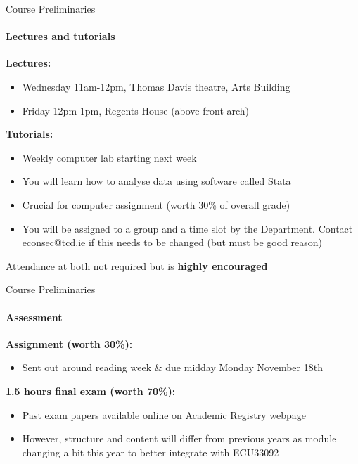 \documentclass[11pt,english,handout]{beamer}
\begin{document}
\begin{frame}{Course Preliminaries}
\framesubtitle{Lectures and tutorials}

\textbf{Lectures:}
\begin{itemize}
	\item Wednesday 11am-12pm, Thomas Davis theatre, Arts Building
	\item Friday 12pm-1pm, Regents House (above front arch)
\end{itemize}
\vspace{0.5cm}

\textbf{Tutorials:}
\begin{itemize}
	\item Weekly computer lab starting next week 
	\item You will learn how to analyse data using software called Stata
	\item Crucial for computer assignment (worth 30\% of overall grade)
	\item You will be assigned to a group and a time slot by the Department. Contact econsec@tcd.ie if this needs to be changed (but must be good reason)
\end{itemize}
\vspace{0.5cm}

Attendance at both not required but is \textbf{highly encouraged}

\end{frame}

\begin{frame}{Course Preliminaries}
	\framesubtitle{Assessment}

\textbf{Assignment (worth 30\%):}
\begin{itemize}
	\item Sent out around reading week \& due midday Monday November 18th
\end{itemize}
\vspace{1cm}

\textbf{1.5 hours final exam (worth 70\%):}
	\begin{itemize}
		\item Past exam papers available online on Academic Registry webpage
		\item However, structure and content will differ from previous years as module changing a bit this year to better integrate with ECU33092
		
	\end{itemize}
\end{frame}
\end{document}
